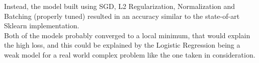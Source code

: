 \documentclass[
	letterpaper, %
	10pt, %
]{class}
\begin{document}
Instead, the model built using SGD, L2 Regularization, Normalization and Batching (properly tuned) resulted in an accuracy similar to the state-of-art Sklearn implementation.\\
Both of the models probably converged to a local minimum, that would explain the high loss, and this could be explained by the Logistic Regression being a weak model for a real world complex problem like the one taken in consideration.


\printbibliography %


\end{document}
